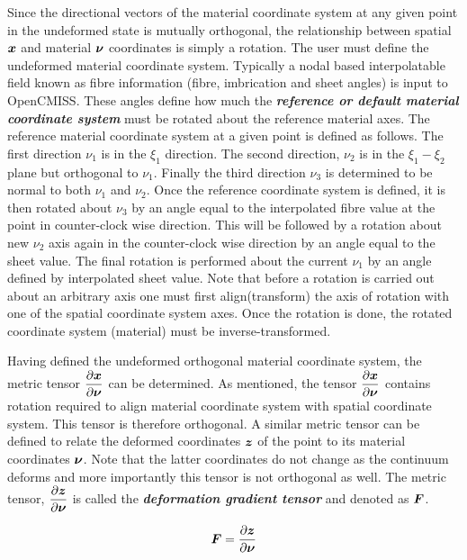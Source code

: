Since the directional vectors of the material coordinate system at any given
point in the undeformed state is mutually orthogonal, the relationship between
spatial $\vect{x}$ and material $\vect{\nu}$ coordinates is simply a
rotation. The user must define the undeformed material coordinate
system. Typically a nodal based interpolatable field known as fibre
information (fibre, imbrication and sheet angles) is input to OpenCMISS. These
angles define how much the \textit{\textbf{reference or default material
    coordinate system}} must be rotated about the reference material axes. The
reference material coordinate system at a given point is defined as
follows. The first direction $\nu_{1}$ is in the $\xi_{1}$ direction. The
second direction, $\nu_{2}$ is in the $\xi_{1}-\xi_{2}$ plane but orthogonal
to $\nu_{1}$. Finally the third direction $\nu_{3}$ is determined to be normal
to both $\nu_{1}$ and $\nu_{2}$. Once the reference coordinate system is
defined, it is then rotated about $\nu_{3}$ by an angle equal to the
interpolated fibre value at the point in counter-clock wise direction. This
will be followed by a rotation about new $\nu_{2}$ axis again in the
counter-clock wise direction by an angle equal to the sheet value. The final
rotation is performed about the current $\nu_{1}$ by an angle defined by
interpolated sheet value. Note that before a rotation is carried out about an
arbitrary axis one must first align(transform) the axis of rotation with one
of the spatial coordinate system axes. Once the rotation is done, the rotated
coordinate system (material) must be inverse-transformed.

Having defined the undeformed orthogonal material coordinate system, the
metric tensor $\delby{\vect{x}}{\vect{\nu}}$ can be determined. As mentioned,
the tensor $\delby{\vect{x}}{\vect{\nu}}$ contains rotation required to align
material coordinate system with spatial coordinate system. This tensor is
therefore orthogonal. A similar metric tensor can be defined to relate the
deformed coordinates $\vect{z}$ of the point to its material coordinates
$\vect{\nu}$. Note that the latter coordinates do not change as the continuum
deforms and more importantly this tensor is not orthogonal as well. The metric
tensor, $\delby{\vect{z}}{\vect{\nu}}$ is called the
\textit{\textbf{deformation gradient tensor}} and denoted as $\matr{F}$.

\begin{equation}
  \matr{F}=\delby{\vect{z}}{\vect{\nu}}
  \label{eqn:deformationgradienttensor}
\end{equation}
 
